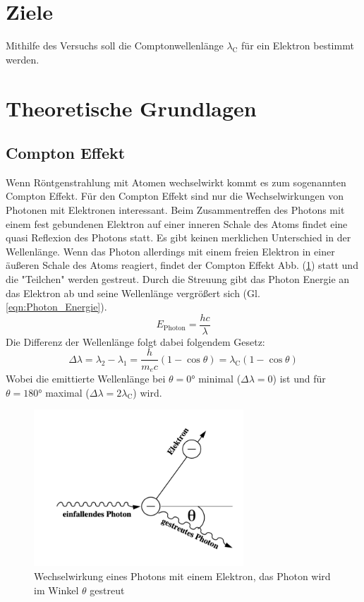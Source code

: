 \section{Ziele}
Mithilfe des Versuchs soll die Comptonwellenlänge $\lambda_{\text{C}}$ für ein Elektron bestimmt werden.

\section{Theoretische Grundlagen}
\label{sec:theorie}

\subsection{Compton Effekt}
Wenn Röntgenstrahlung mit Atomen wechselwirkt kommt es zum sogenannten Compton Effekt.
Für den Compton Effekt sind nur die Wechselwirkungen von Photonen mit Elektronen interessant.
Beim Zusammentreffen des Photons mit einem fest gebundenen Elektron auf einer inneren Schale des Atoms findet eine quasi Reflexion des Photons statt. Es gibt keinen merklichen Unterschied in der Wellenlänge.
Wenn das Photon allerdings mit einem freien Elektron in einer äußeren Schale des Atoms reagiert, findet der Compton Effekt Abb. (\ref{fig:Compton_Effekt}) statt und die "Teilchen" werden gestreut.
Durch die Streuung gibt das Photon Energie an das Elektron ab und seine Wellenlänge vergrößert sich (Gl. \ref{eqn:Photon_Energie}).
\begin{equation}
    E_{\text{Photon}} = \frac{hc}{\lambda} \label{eqn:Photon_Energie}
\end{equation}
Die Differenz der Wellenlänge folgt dabei folgendem Gesetz:
\begin{equation*}
    \Delta \lambda = \lambda_2 - \lambda_1
                    = \frac{h}{m_e c}\left( 1- \cos \theta \right) 
                    = \lambda_{\text{C}} \left( 1- \cos \theta \right) \label{eqn:Compton_Gesetz} 
\end{equation*}
Wobei die emittierte Wellenlänge bei $\theta = 0°$ minimal ($\Delta\lambda = 0$) ist und für $\theta = 180°$ maximal ($\Delta\lambda = 2\lambda_{\text{C}}$) wird.
\begin{figure}
    \centering
    \includegraphics[width=0.7\textwidth]{bilder/Compton_Effekt.png}
    \caption{Wechselwirkung eines Photons mit einem Elektron, das Photon wird im Winkel $\theta$ gestreut}
    \label{fig:Compton_Effekt}
\end{figure}
